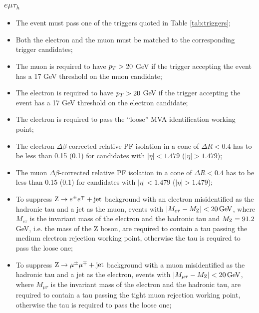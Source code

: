 \subsubsection{$e\mu\tau_h$}
\begin{itemize}
\item The event must pass one of the triggers quoted in Table \ref{tab:triggers};
\item Both the electron and the muon must be matched to the corresponding trigger candidates;
\item The muon is required to have $p_{T} > 20$ GeV if the trigger accepting the event has a 17 GeV threshold on the muon candidate;
\item The electron is required to have $p_{T} > 20$ GeV if the trigger accepting the event has a 17 GeV threshold on the electron candidate;
\item The electron is required to pass the ``loose'' MVA identification working point;
\item The electron $\Delta \beta$-corrected relative PF isolation in a cone of $\Delta R < 0.4$ has to be less than 0.15 (0.1) for candidates with $|\eta| < 1.479$ ($|\eta| > 1.479$);
\item The muon $\Delta \beta$-corrected relative PF isolation in a cone of $\Delta R < 0.4$ has to be less than 0.15 (0.1) for candidates with $|\eta| < 1.479$ ($|\eta| > 1.479$);
\item To suppress $\mathrm{Z}\rightarrow e^\pm e^\mp+\mathrm{jet}$ background with an electron misidentified as the hadronic tau and a jet as the muon, events with $|M_{e\tau} - M_{\mathrm{Z}}| < 20\, \mathrm{GeV}$, where $M_{e\tau}$ is the invariant mass of the electron and the hadronic tau and $M_{\mathrm{Z}} = 91.2$ GeV, i.e. the mass of the Z boson, are required to contain a tau passing the medium electron rejection working point, otherwise the tau is required to pass the loose one;
\item To suppress $\mathrm{Z}\rightarrow\mu^\pm \mu^\mp+\mathrm{jet}$ background with a muon misidentified as the hadronic tau and a jet as the electron, events with $|M_{\mu\tau} - M_{\mathrm{Z}}| < 20\, \mathrm{GeV}$, where $M_{\mu\tau}$ is the invariant mass of the electron and the hadronic tau, are required to contain a tau passing the tight muon rejection working point, otherwise the tau is required to pass the loose one;
\end{itemize}


